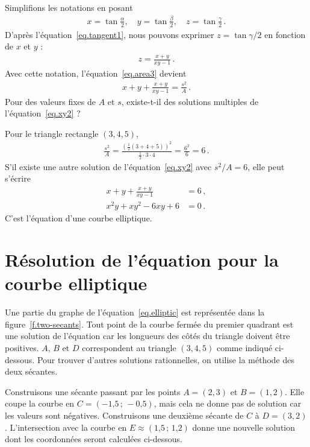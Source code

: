 Simplifions les notations en posant 
\begin{align}
x=\tan \frac{\alpha}{2},\quad
y=\tan \frac{\beta}{2},\quad
z=\tan \frac{\gamma}{2}\,.\label{eq.variables-for-tangents}
\end{align}
D'après l'équation~\ref{eq.tangent1},  nous pouvons exprimer $z=\tan\gamma/2$ en fonction de $x$ et $y$ :
\begin{align}
z = \frac{x+y}{xy-1}\,.\label{eq.xy1}
\end{align}
Avec cette notation, l'équation~\ref{eq.area3} devient 
\begin{align}
x+y+\frac{x+y}{xy-1}=\frac{s^2}{A}\,.\label{eq.xy2}
\end{align}
Pour des valeurs fixes de $A$ et $s$, existe-t-il des solutions multiples de l'équation~\ref{eq.xy2} ?

Pour le triangle rectangle $(3,4,5)$,
\begin{align}
\frac{s^2}{A} = \frac{\left(\frac{1}{2}(3+4+5)\right)^2}{\frac{1}{2}\cdot 3\cdot 4} = \frac{6^2}{6}=6\,.
\end{align}
S'il existe une autre solution de l'équation~\ref{eq.xy2} avec $s^2/A=6$, elle peut s'écrire 
\begin{subequations}
\begin{align}
x+y+\frac{x+y}{xy-1}&=6\,,\\
x^2y + xy^2 -6xy + 6 &= 0\,.\label{eq.elliptic}
\end{align}
\end{subequations}
C'est l'équation d'une courbe elliptique.

\section{Résolution de l'équation pour la courbe elliptique}

Une partie du graphe de l'équation~\ref{eq.elliptic} est représentée dans la figure~\ref{f.two-secants}. Tout point de la courbe fermée du premier quadrant est une solution de l'équation car les longueurs des côtés du triangle doivent être positives. $A$, $B$ et $D$ correspondent au triangle $(3,4,5)$ comme indiqué ci-dessous. Pour trouver d'autres solutions rationnelles, on utilise la méthode des deux sécantes.

Construisons une sécante passant par les points $A=(2,3)$ et $B=(1,2)$. Elle coupe la courbe en $C=(-\mbox{1,5}\,;\,-\mbox{0,5})$, mais cela ne donne pas de solution car les valeurs sont négatives. Construisons une deuxième sécante de $C$ à $D=(3,2)$. L'intersection avec la courbe en $E\approx (\mbox{1,5}\,;\,\mbox{1,2})$ donne une nouvelle solution dont les coordonnées seront calculées ci-dessous.

